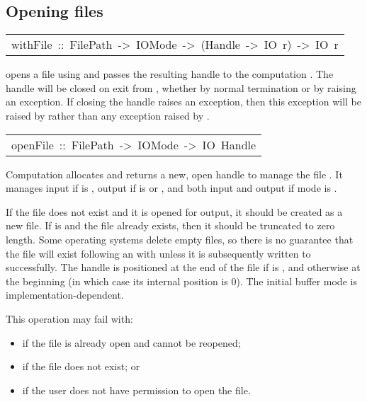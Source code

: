 \subsection{Opening files
}
\begin{haddockdesc}
\item[\begin{tabular}{@{}l}
withFile\ ::\ FilePath\ ->\ IOMode\ ->\ (Handle\ ->\ IO\ r)\ ->\ IO\ r
\end{tabular}]\haddockbegindoc
{} opens a file using  and passes
 the resulting handle to the computation .  The handle will be
 closed on exit from , whether by normal termination or by
 raising an exception.  If closing the handle raises an exception, then
 this exception will be raised by  rather than any exception
 raised by .
\par

\end{haddockdesc}
\begin{haddockdesc}
\item[\begin{tabular}{@{}l}
openFile\ ::\ FilePath\ ->\ IOMode\ ->\ IO\ Handle
\end{tabular}]\haddockbegindoc
Computation   allocates and returns a new, open
 handle to manage the file .  It manages input if 
 is , output if  is  or ,
 and both input and output if mode is .
\par
If the file does not exist and it is opened for output, it should be
 created as a new file.  If  is  and the file
 already exists, then it should be truncated to zero length.
 Some operating systems delete empty files, so there is no guarantee
 that the file will exist following an  with 
  unless it is subsequently written to successfully.
 The handle is positioned at the end of the file if  is
 , and otherwise at the beginning (in which case its
 internal position is 0).
 The initial buffer mode is implementation-dependent.
\par
This operation may fail with:
\par
\begin{itemize}
\item
  if the file is already open and cannot be reopened;
\par

\item
  if the file does not exist; or
\par

\item
  if the user does not have permission to open the file.
\par

\end{itemize}

\end{haddockdesc}
